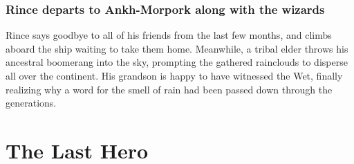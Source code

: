 \subsubsection{\Gls{Rince} departs to Ankh-Morpork along with the wizards}
\Gls{Rince} says goodbye to all of his friends from the last few months, and climbs aboard the 
ship waiting to take them home. Meanwhile, a tribal elder throws his ancestral boomerang into the 
sky, prompting the gathered rainclouds to disperse all over the continent. His grandson is happy to 
have witnessed the Wet, finally realizing why a word for the smell of rain had been passed down 
through the generations.


\section{The Last Hero}


\subsection{}
\subsubsection{}
